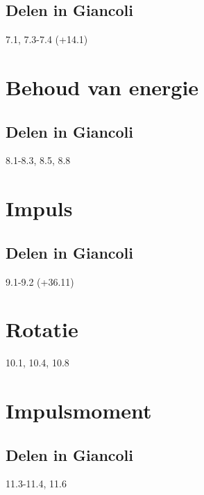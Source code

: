 \documentclass[12pt,a4paper]{article}
\begin{document}
    \subsection{Delen in Giancoli}
    7.1, 7.3-7.4 (+14.1)


    \section{Behoud van energie}

    \subsection{Delen in Giancoli}
    8.1-8.3, 8.5, 8.8


    \section{Impuls}

    \subsection{Delen in Giancoli}
    9.1-9.2 (+36.11)


    \section{Rotatie}
    10.1, 10.4, 10.8


    \section{Impulsmoment}

    \subsection{Delen in Giancoli}
    11.3-11.4, 11.6
\end{document}
